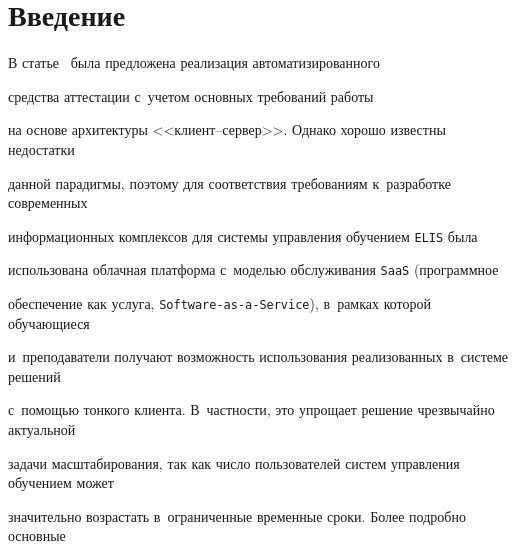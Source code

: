 




















      \thispagestyle{headings}


      







\section{Введение}





В статье~\cite{Gorshenin2016b-2} была предложена реализация автоматизированного 


средства аттестации с~учетом основных требований  работы~\cite{Gorshenin2014-2} 


на основе архитектуры <<кли\-ент--сер\-вер>>. Однако хорошо известны недостатки 


данной парадигмы, поэтому для соответствия требованиям к~разработке современных 


информационных комплексов для системы управления обучением \verb"ELIS" была 


использована облачная платформа с~моделью обслуживания \verb"SaaS" (программное 


обеспечение как услуга, \verb"Software-as-a-Service"), в~рамках которой обучающиеся 


и~преподаватели получают возможность использования реализованных в~системе решений  


с~по\-мощью тонкого клиента. В~част\-ности, это упрощает решение чрезвычайно актуальной 


задачи масштабирования, так как число пользователей систем управления обучением может 


значительно возрастать в~ограниченные временные сроки. Более подробно основные 


